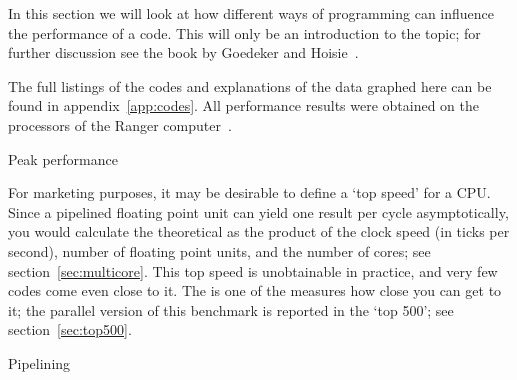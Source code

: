 
In this section we will look at how different ways of programming can
influence the performance of a code. This will only be an introduction
to the topic; for further discussion see the book by Goedeker and
Hoisie~\cite{Goedeker:performance-book}.

The full listings of the codes and explanations of the data graphed
here can be found in appendix~\ref{app:codes}. All performance results
were obtained on the  processors of the Ranger
computer~\cite{tacc:ranger}.

 {Peak performance}

For marketing purposes, it may be desirable to define a `top speed' for a
CPU. Since a pipelined floating point unit can yield one result per
cycle asymptotically, you would calculate the theoretical
 as the product of the clock speed (in
ticks per second), number of floating point units, and the number of
cores; see section~\ref{sec:multicore}.  This top speed is
unobtainable in practice, and very few codes come even close to it.
The  is one of the measures how close
you can get to it; the parallel version of this benchmark is reported
in the `top 500'; see section~\ref{sec:top500}. 

 {Pipelining}
\label{sec:coding-pipeline}

